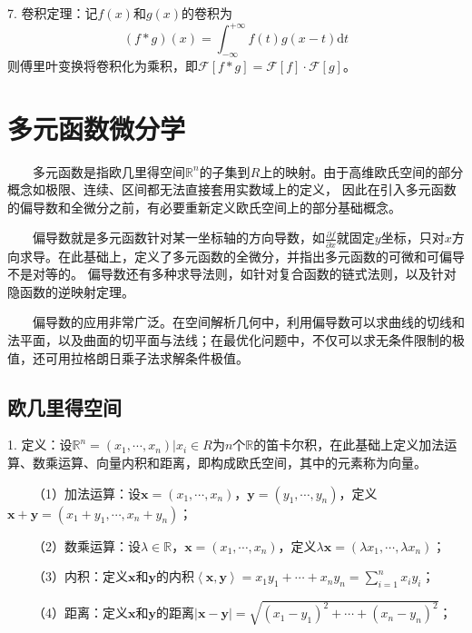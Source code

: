 7. 卷积定理：记$f(x)$和$g(x)$的卷积为
\begin{equation*}
    (f*g)(x)=\int_{-\infty}^{+\infty} f(t)g(x-t)\mathrm{d}t
\end{equation*}
则傅里叶变换将卷积化为乘积，即$\mathscr{F}[f*g]=\mathscr{F}[f]\cdot \mathscr{F}[g]$。

\section{多元函数微分学}

\begin{tcolorbox}[colback=red!5,colframe=red!75!black]
    ~~~~多元函数是指欧几里得空间$\mathbb{R}^n$的子集到$R$上的映射。由于高维欧氏空间的部分概念如极限、连续、区间都无法直接套用实数域上的定义，
    因此在引入多元函数的偏导数和全微分之前，有必要重新定义欧氏空间上的部分基础概念。

    ~~~~偏导数就是多元函数针对某一坐标轴的方向导数，如$\frac{\partial f}{\partial x}$就固定$y$坐标，只对$x$方向求导。在此基础上，定义了多元函数的全微分，并指出多元函数的可微和可偏导不是对等的。
    偏导数还有多种求导法则，如针对复合函数的链式法则，以及针对隐函数的逆映射定理。

    ~~~~偏导数的应用非常广泛。在空间解析几何中，利用偏导数可以求曲线的切线和法平面，以及曲面的切平面与法线；在最优化问题中，不仅可以求无条件限制的极值，还可用拉格朗日乘子法求解条件极值。
\end{tcolorbox}

\subsection{欧几里得空间}

1. 定义：设$\mathbb{R}^n={(x_1,\cdots,x_n)|x_i\in R}$为$n$个$\mathbb{R}$的笛卡尔积，在此基础上定义加法运算、数乘运算、向量内积和距离，即构成欧氏空间，其中的元素称为向量。

~~~~（1）加法运算：设$\mathbf{x}=(x_1,\cdots,x_n)$，$\mathbf{y}=(y_1,\cdots,y_n)$，定义$\mathbf{x}+\mathbf{y}=(x_1+y_1,\cdots,x_n+y_n)$；

~~~~（2）数乘运算：设$\lambda\in \mathbb{R}$，$\mathbf{x}=(x_1,\cdots,x_n)$，定义$\lambda\mathbf{x}=(\lambda x_1,\cdots,\lambda x_n)$；

~~~~（3）内积：定义$\mathbf{x}$和$\mathbf{y}$的内积$\left\langle\mathbf{x},\mathbf{y}\right\rangle=x_1y_1+\cdots+x_ny_n=\sum\limits_{i=1}^n x_iy_i$；

~~~~（4）距离：定义$\mathbf{x}$和$\mathbf{y}$的距离$|\mathbf{x}-\mathbf{y}|=\sqrt{(x_1-y_1)^2+\cdots+(x_n-y_n)^2}$；

